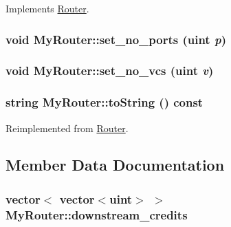 Implements \hyperlink{classRouter_33073537e883e8bea1a25690bcb70049}{Router}.\hypertarget{classMyRouter_ce1887c47f021ee3a26f678f00939bf0}{
\subsubsection[{set\_\-no\_\-ports}]{\setlength{\rightskip}{0pt plus 5cm}void MyRouter::set\_\-no\_\-ports ({\bf uint} {\em p})}}
\label{classMyRouter_ce1887c47f021ee3a26f678f00939bf0}


\hypertarget{classMyRouter_b7a91b2d68f0ad85e1ae3801111985c9}{
\subsubsection[{set\_\-no\_\-vcs}]{\setlength{\rightskip}{0pt plus 5cm}void MyRouter::set\_\-no\_\-vcs ({\bf uint} {\em v})}}
\label{classMyRouter_b7a91b2d68f0ad85e1ae3801111985c9}


\hypertarget{classMyRouter_9b40e1d62a4638fb84f31aff143d970d}{
\subsubsection[{toString}]{\setlength{\rightskip}{0pt plus 5cm}string MyRouter::toString () const}}
\label{classMyRouter_9b40e1d62a4638fb84f31aff143d970d}




Reimplemented from \hyperlink{classRouter_1e749a51dcf6cbd6925ac677473c7f58}{Router}.

\subsection{Member Data Documentation}
\hypertarget{classMyRouter_f15a834dbd27a5070e1b0388c2a40d4c}{
\subsubsection[{downstream\_\-credits}]{\setlength{\rightskip}{0pt plus 5cm}vector$<$ vector$<${\bf uint}$>$ $>$ {\bf MyRouter::downstream\_\-credits}}}
\label{classMyRouter_f15a834dbd27a5070e1b0388c2a40d4c}


